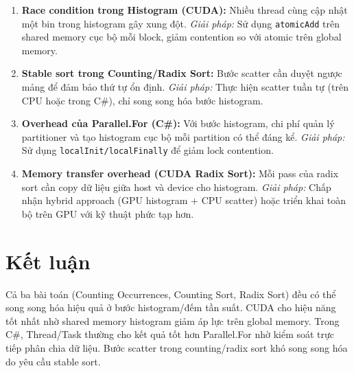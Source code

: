 \documentclass[12pt,a4paper]{article}
\begin{document}
\begin{enumerate}[nosep]
    \item \textbf{Race condition trong Histogram (CUDA):} Nhiều thread cùng cập nhật một bin trong histogram gây xung đột. \textit{Giải pháp:} Sử dụng \texttt{atomicAdd} trên shared memory cục bộ mỗi block, giảm contention so với atomic trên global memory.

    \item \textbf{Stable sort trong Counting/Radix Sort:} Bước scatter cần duyệt ngược mảng để đảm bảo thứ tự ổn định. \textit{Giải pháp:} Thực hiện scatter tuần tự (trên CPU hoặc trong C\#), chỉ song song hóa bước histogram.

    \item \textbf{Overhead của Parallel.For (C\#):} Với bước histogram, chi phí quản lý partitioner và tạo histogram cục bộ mỗi partition có thể đáng kể. \textit{Giải pháp:} Sử dụng \texttt{localInit/localFinally} để giảm lock contention.

    \item \textbf{Memory transfer overhead (CUDA Radix Sort):} Mỗi pass của radix sort cần copy dữ liệu giữa host và device cho histogram. \textit{Giải pháp:} Chấp nhận hybrid approach (GPU histogram + CPU scatter) hoặc triển khai toàn bộ trên GPU với kỹ thuật phức tạp hơn.
\end{enumerate}

\section*{Kết luận}
Cả ba bài toán (Counting Occurrences, Counting Sort, Radix Sort) đều có thể song song hóa hiệu quả ở bước histogram/đếm tần suất. CUDA cho hiệu năng tốt nhất nhờ shared memory histogram giảm áp lực trên global memory. Trong C\#, Thread/Task thường cho kết quả tốt hơn Parallel.For nhờ kiểm soát trực tiếp phân chia dữ liệu. Bước scatter trong counting/radix sort khó song song hóa do yêu cầu stable sort.
\end{document}
